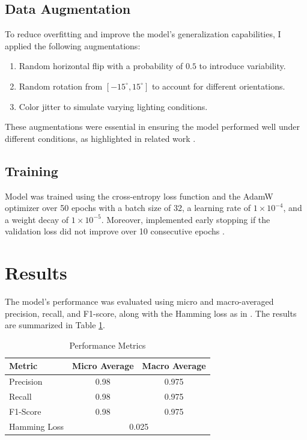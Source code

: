 \documentclass[conference]{IEEEtran}
\begin{document}
\subsection{Data Augmentation}
To reduce overfitting and improve the model's generalization capabilities, I applied the following augmentations:
\begin{enumerate}
    \item Random horizontal flip with a probability of $0.5$ to introduce variability.
    \item Random rotation from $[-15^\circ, 15^\circ]$ to account for different orientations.
    \item Color jitter to simulate varying lighting conditions.
\end{enumerate}
These augmentations were essential in ensuring the model performed well under different conditions, as highlighted in related work \cite{sebastian2024}.

\subsection{Training}
Model was trained using the cross-entropy loss function and the AdamW optimizer over 50 epochs with a batch size of 32, a learning rate of $1 \times 10^{-4}$, and a weight decay of $1 \times 10^{-5}$. Moreover, implemented early stopping if the validation loss did not improve over 10 consecutive epochs \cite{sebastian2024}.

\section{Results}

The model's performance was evaluated using micro and macro-averaged precision, recall, and F1-score, along with the Hamming loss as in \cite{sebastian2024}. The results are summarized in Table \ref{tab:metrics}.

\begin{table}[h]
\centering
\caption{Performance Metrics}
\label{tab:metrics}
\begin{tabular}{|l|c|c|}
\hline
Metric & Micro Average & Macro Average \\ \hline
Precision & 0.98 & 0.975 \\ \hline
Recall & 0.98 & 0.975 \\ \hline
F1-Score & 0.98 & 0.975 \\ \hline
Hamming Loss & \multicolumn{2}{c|}{0.025} \\ \hline
\end{tabular}
\end{table}
\end{document}

